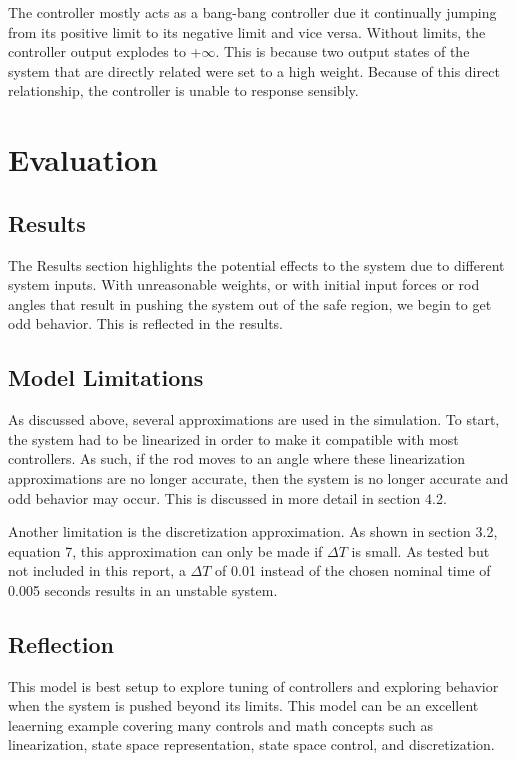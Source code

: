 \documentclass{article}
\begin{document}
    The controller mostly acts as a bang-bang controller due it continually jumping from its positive limit to its negative limit and vice versa. Without limits, the controller output explodes to +$\infty$. This is because two output states of the system that are directly related were set to a high weight. Because of this direct relationship, the controller is unable to response sensibly.
    

\section{Evaluation}

\subsection{Results}

The Results section highlights the potential effects to the system due to different system inputs. With unreasonable weights, or with initial input forces or rod angles that result in pushing the system out of the safe region, we begin to get odd behavior. This is reflected in the results. 

\subsection{Model Limitations}

As discussed above, several approximations are used in the simulation. To start, the system had to be linearized in order to make it compatible with most controllers. As such, if the rod moves to an angle where these linearization approximations are no longer accurate, then the system is no longer accurate and odd behavior may occur. This is discussed in more detail in section 4.2. 

Another limitation is the discretization approximation. As shown in section 3.2, equation 7, this approximation can only be made if $\Delta T$ is small. As tested but not included in this report, a $\Delta T$ of 0.01 instead of the chosen nominal time of 0.005 seconds results in an unstable system.

\subsection{Reflection}

This model is best setup to explore tuning of controllers and exploring behavior when the system is pushed beyond its limits. This model can be an excellent leaerning example covering many controls and math concepts such as linearization, state space representation, state space control, and discretization.
\end{document}
